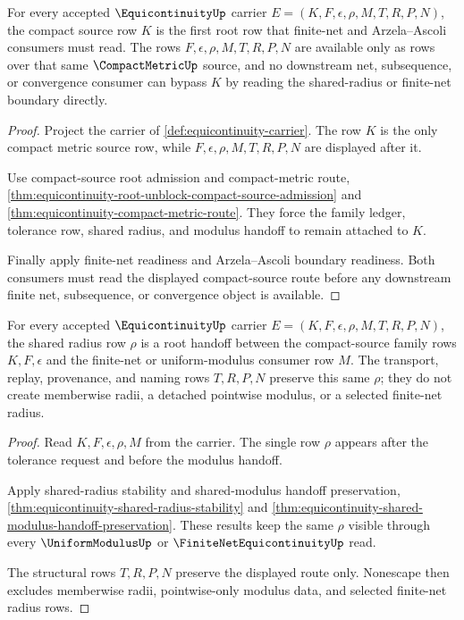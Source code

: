 \begin{theorem}
\label{thm:equicontinuity-root-unblock-compact-source-row}
For every accepted $\EquicontinuityUp$ carrier $E=(K,F,\epsilon,\rho,M,T,R,P,N)$, the compact source row $K$ is the first root row that finite-net and Arzela--Ascoli consumers must read. The rows $F,\epsilon,\rho,M,T,R,P,N$ are available only as rows over that same $\CompactMetricUp$ source, and no downstream net, subsequence, or convergence consumer can bypass $K$ by reading the shared-radius or finite-net boundary directly.
\end{theorem}
\begin{proof}
Project the carrier of \autoref{def:equicontinuity-carrier}. The row $K$ is the only compact metric source row, while $F,\epsilon,\rho,M,T,R,P,N$ are displayed after it.

Use compact-source root admission and compact-metric route, \autoref{thm:equicontinuity-root-unblock-compact-source-admission} and \autoref{thm:equicontinuity-compact-metric-route}. They force the family ledger, tolerance row, shared radius, and modulus handoff to remain attached to $K$.

Finally apply finite-net readiness and Arzela--Ascoli boundary readiness. Both consumers must read the displayed compact-source route before any downstream finite net, subsequence, or convergence object is available.
\end{proof}

\begin{theorem}
\label{thm:equicontinuity-root-unblock-shared-radius-handoff}
For every accepted $\EquicontinuityUp$ carrier $E=(K,F,\epsilon,\rho,M,T,R,P,N)$, the shared radius row $\rho$ is a root handoff between the compact-source family rows $K,F,\epsilon$ and the finite-net or uniform-modulus consumer row $M$. The transport, replay, provenance, and naming rows $T,R,P,N$ preserve this same $\rho$; they do not create memberwise radii, a detached pointwise modulus, or a selected finite-net radius.
\end{theorem}
\begin{proof}
Read $K,F,\epsilon,\rho,M$ from the carrier. The single row $\rho$ appears after the tolerance request and before the modulus handoff.

Apply shared-radius stability and shared-modulus handoff preservation, \autoref{thm:equicontinuity-shared-radius-stability} and \autoref{thm:equicontinuity-shared-modulus-handoff-preservation}. These results keep the same $\rho$ visible through every $\UniformModulusUp$ or $\FiniteNetEquicontinuityUp$ read.

The structural rows $T,R,P,N$ preserve the displayed route only. Nonescape then excludes memberwise radii, pointwise-only modulus data, and selected finite-net radius rows.
\end{proof}

